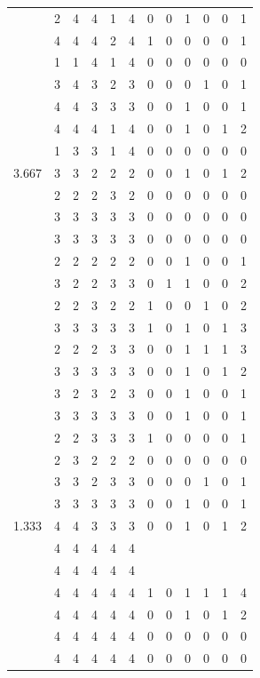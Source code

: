 \documentclass[]{book}
\theoremstyle{definition}
\theoremstyle{definition}
\theoremstyle{definition}
\theoremstyle{remark}
\begin{document}
\begin{table}
{\begin{tabular}[t]{rrrrrrrrrrrr}
 & 2 & 4 & 4 & 1 & 4 & 0 & 0 & 1 & 0 & 0 & 1\\
 & 4 & 4 & 4 & 2 & 4 & 1 & 0 & 0 & 0 & 0 & 1\\
 & 1 & 1 & 4 & 1 & 4 & 0 & 0 & 0 & 0 & 0 & 0\\
 & 3 & 4 & 3 & 2 & 3 & 0 & 0 & 0 & 1 & 0 & 1\\
 & 4 & 4 & 3 & 3 & 3 & 0 & 0 & 1 & 0 & 0 & 1\\
 & 4 & 4 & 4 & 1 & 4 & 0 & 0 & 1 & 0 & 1 & 2\\
 & 1 & 3 & 3 & 1 & 4 & 0 & 0 & 0 & 0 & 0 & 0\\
3.667 & 3 & 3 & 2 & 2 & 2 & 0 & 0 & 1 & 0 & 1 & 2\\
 & 2 & 2 & 2 & 3 & 2 & 0 & 0 & 0 & 0 & 0 & 0\\
 & 3 & 3 & 3 & 3 & 3 & 0 & 0 & 0 & 0 & 0 & 0\\
 & 3 & 3 & 3 & 3 & 3 & 0 & 0 & 0 & 0 & 0 & 0\\
 & 2 & 2 & 2 & 2 & 2 & 0 & 0 & 1 & 0 & 0 & 1\\
 & 3 & 2 & 2 & 3 & 3 & 0 & 1 & 1 & 0 & 0 & 2\\
 & 2 & 2 & 3 & 2 & 2 & 1 & 0 & 0 & 1 & 0 & 2\\
 & 3 & 3 & 3 & 3 & 3 & 1 & 0 & 1 & 0 & 1 & 3\\
 & 2 & 2 & 2 & 3 & 3 & 0 & 0 & 1 & 1 & 1 & 3\\
 & 3 & 3 & 3 & 3 & 3 & 0 & 0 & 1 & 0 & 1 & 2\\
 & 3 & 2 & 3 & 2 & 3 & 0 & 0 & 1 & 0 & 0 & 1\\
 & 3 & 3 & 3 & 3 & 3 & 0 & 0 & 1 & 0 & 0 & 1\\
 & 2 & 2 & 3 & 3 & 3 & 1 & 0 & 0 & 0 & 0 & 1\\
 & 2 & 3 & 2 & 2 & 2 & 0 & 0 & 0 & 0 & 0 & 0\\
 & 3 & 3 & 2 & 3 & 3 & 0 & 0 & 0 & 1 & 0 & 1\\
 & 3 & 3 & 3 & 3 & 3 & 0 & 0 & 1 & 0 & 0 & 1\\
1.333 & 4 & 4 & 3 & 3 & 3 & 0 & 0 & 1 & 0 & 1 & 2\\
 & 4 & 4 & 4 & 4 & 4 &  &  &  &  &  & \\
 & 4 & 4 & 4 & 4 & 4 &  &  &  &  &  & \\
 & 4 & 4 & 4 & 4 & 4 & 1 & 0 & 1 & 1 & 1 & 4\\
 & 4 & 4 & 4 & 4 & 4 & 0 & 0 & 1 & 0 & 1 & 2\\
 & 4 & 4 & 4 & 4 & 4 & 0 & 0 & 0 & 0 & 0 & 0\\
 & 4 & 4 & 4 & 4 & 4 & 0 & 0 & 0 & 0 & 0 & 0\\

\end{tabular}}
\end{table}
\end{document}
